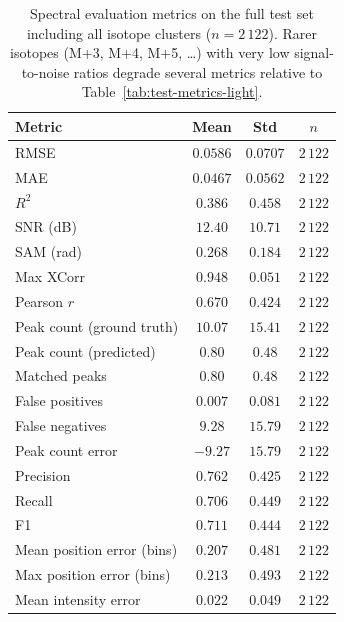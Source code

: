 \documentclass[12pt,a4paper]{report}
\begin{document}
\begin{table}[H]
  \centering
  \caption{Spectral evaluation metrics on the full test set including all isotope clusters ($n = 2\,122$).  Rarer isotopes (M+3, M+4, M+5, \ldots) with very low signal-to-noise ratios degrade several metrics relative to Table~\ref{tab:test-metrics-light}.}
  \label{tab:test-metrics-full}
  \begin{tabular}{@{}lccc@{}}
    \toprule
    \textbf{Metric} & \textbf{Mean} & \textbf{Std} & \textbf{$n$} \\
    \midrule
    RMSE                    & $0.0586$ & $0.0707$ & $2\,122$ \\
    MAE                     & $0.0467$ & $0.0562$ & $2\,122$ \\
    $R^2$                   & $0.386$  & $0.458$  & $2\,122$ \\
    SNR (dB)                & $12.40$  & $10.71$  & $2\,122$ \\
    SAM (rad)               & $0.268$  & $0.184$  & $2\,122$ \\
    Max XCorr               & $0.948$  & $0.051$  & $2\,122$ \\
    Pearson $r$             & $0.670$  & $0.424$  & $2\,122$ \\
    \midrule
    Peak count (ground truth) & $10.07$  & $15.41$  & $2\,122$ \\
    Peak count (predicted)    & $0.80$   & $0.48$   & $2\,122$ \\
    Matched peaks             & $0.80$   & $0.48$   & $2\,122$ \\
    False positives           & $0.007$  & $0.081$  & $2\,122$ \\
    False negatives           & $9.28$   & $15.79$  & $2\,122$ \\
    Peak count error          & $-9.27$  & $15.79$  & $2\,122$ \\
    \midrule
    Precision                & $0.762$  & $0.425$  & $2\,122$ \\
    Recall                   & $0.706$  & $0.449$  & $2\,122$ \\
    F1                       & $0.711$  & $0.444$  & $2\,122$ \\
    \midrule
    Mean position error (bins) & $0.207$ & $0.481$ & $2\,122$ \\
    Max position error (bins)  & $0.213$ & $0.493$ & $2\,122$ \\
    Mean intensity error       & $0.022$ & $0.049$ & $2\,122$ \\
    \midrule

\end{tabular}
\end{table}
\end{document}
